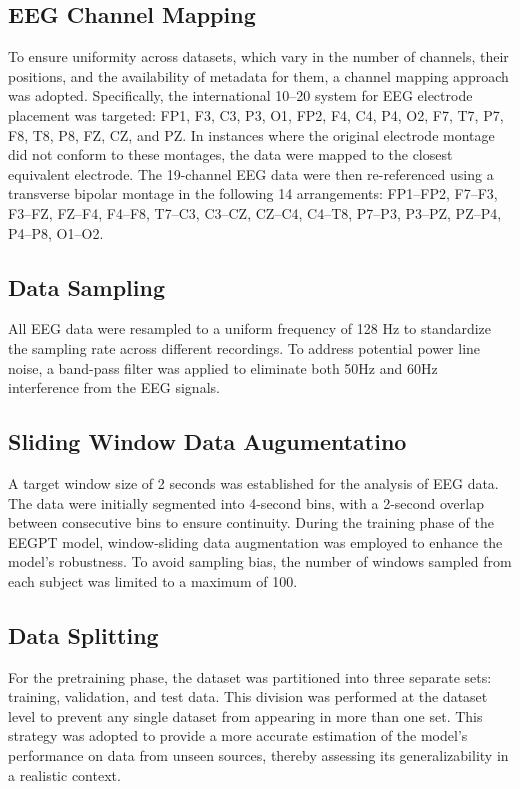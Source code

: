 \documentclass[final,3p,times,twocolumn]{elsarticle}
\begin{document}
\subsection{EEG Channel Mapping}
To ensure uniformity across datasets, which vary in the number of channels, their positions, and the availability of metadata for them, a channel mapping approach was adopted. Specifically, the international 10--20 system for EEG electrode placement was targeted: FP1, F3, C3, P3, O1, FP2, F4, C4, P4, O2, F7, T7, P7, F8, T8, P8, FZ, CZ, and PZ. In instances where the original electrode montage did not conform to these montages, the data were mapped to the closest equivalent electrode. The 19-channel EEG data were then re-referenced using a transverse bipolar montage in the following 14 arrangements: FP1--FP2, F7--F3, F3--FZ, FZ--F4, F4--F8, T7--C3, C3--CZ, CZ--C4, C4--T8, P7--P3, P3--PZ, PZ--P4, P4--P8, O1--O2.
    
\subsection{Data Sampling}
All EEG data were resampled to a uniform frequency of 128 Hz to standardize the sampling rate across different recordings. To address potential power line noise, a band-pass filter was applied to eliminate both 50Hz and 60Hz interference from the EEG signals.

\subsection{Sliding Window Data Augumentatino}
A target window size of 2 seconds was established for the analysis of EEG data. The data were initially segmented into 4-second bins, with a 2-second overlap between consecutive bins to ensure continuity. During the training phase of the EEGPT model, window-sliding data augmentation was employed to enhance the model's robustness. To avoid sampling bias, the number of windows sampled from each subject was limited to a maximum of 100.

\subsection{Data Splitting}
For the pretraining phase, the dataset was partitioned into three separate sets: training, validation, and test data. This division was performed at the dataset level to prevent any single dataset from appearing in more than one set. This strategy was adopted to provide a more accurate estimation of the model's performance on data from unseen sources, thereby assessing its generalizability in a realistic context.
\end{document}
